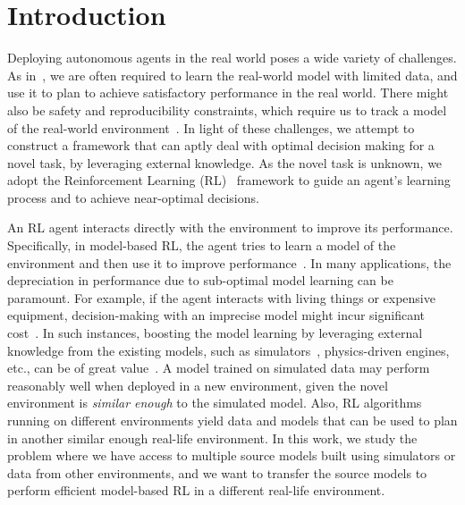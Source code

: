 \section{Introduction}\label{sec:intro}

Deploying autonomous agents in the real world poses a wide variety of challenges. As in~\citep{dulac2021challenges}, we are often required to learn the real-world model with limited data, and use it to plan to achieve satisfactory performance in the real world. There might also be safety and reproducibility constraints, which require us to track a model of the real-world environment~\citep{skirzynski2021automatic}.
In light of these challenges, we attempt to construct a framework that can aptly deal with optimal decision making for a novel task, by leveraging external knowledge. As the novel task is unknown, we adopt the Reinforcement Learning (RL)~\citep{sutton2018reinforcement} framework to guide an agent's learning process and to achieve near-optimal decisions.

An RL agent interacts directly with the environment to improve its performance. Specifically, in model-based RL, the agent tries to learn a model of the environment and then use it to improve performance~\citep{moerland2020model}. In many applications, the depreciation in performance due to sub-optimal model learning can be paramount. For example, if the agent interacts with living things or expensive equipment, decision-making with an imprecise model might incur significant cost~\citep{polydoros2017survey}. In such instances, boosting the model learning by leveraging external knowledge from the existing models, such as simulators~\citep{peng2018sim}, physics-driven engines, etc., can be of great value~\citep{taylor2008transferring}. A model trained on simulated data may perform reasonably well when deployed in a new environment, given the novel environment is \emph{similar enough} to the simulated model. 
Also, RL algorithms running on different environments yield data and models that can be used to plan in another similar enough real-life environment.
In this work, we study the problem where we have access to multiple source models built using simulators or data from other environments, and we want to transfer the source models to perform efficient model-based RL in a different real-life environment.

